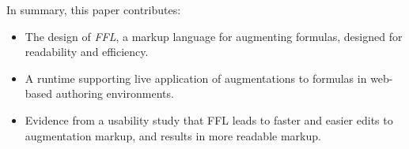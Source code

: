 
In summary, this paper contributes:
\begin{itemize}
\item The design of \emph{FFL}, a markup language for augmenting formulas, designed for readability and efficiency.

\item A runtime supporting live application of augmentations to formulas in web-based authoring environments.



\item Evidence from a usability study that FFL leads to faster and easier edits to augmentation markup, and results in more readable markup.

\end{itemize}

